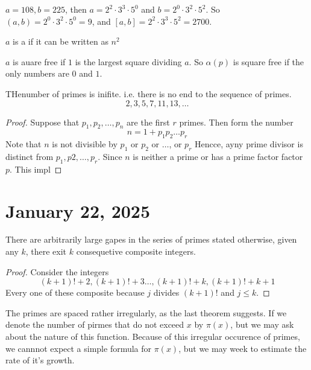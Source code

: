 \documentclass[11pt]{article}
\begin{document}
\begin{example}
    \(a = 108, b = 225\), then \(a = 2^2 \cdot 3^3 \cdot 5^0\) and \(b = 2^0 \cdot 3^2 \cdot 5^2\). So \((a, b) = 2^0 \cdot 3^2 \cdot 5^0 = 9\), and \([a, b] = 2^2 \cdot 3^3 \cdot 5^2 = 2700\).
\end{example}

\begin{definition}
    \(a\) is a  if it can be written as \(n^2\)
\end{definition}
\begin{remark}
    \(a\) is auare free if \(1\) is the largest square dividing \(a\). So \(\alpha(p)\) is square free if the only numbers are \(0\) and \(1\).
\end{remark}

\begin{theorem}[Euclid]
    THenumber of primes is inifite. i.e. there is no end to the sequence of primes. \[2, 3, 5, 7, 11, 13, \ldots\]
\end{theorem}

\begin{proof}
    Suppose that \(p_1, p_2, \ldots, p_n\) are the first \(r\) primes. Then form the number \[n = 1 + p_1 p_2\ldots p_r\]
    Note that \(n\) is not divisible by \(p_1\) or \(p_2\) or \(\ldots\), or
    \(p_r\) Hencce, ayny prime divisor is distinct from \(p_1, p2, \ldots, p_r\).
    Since \(n\) is neither a prime or has a prime factor factor \(p\). This impl
\end{proof}
\section{January 22, 2025}
\begin{theorem}
    There are arbitrarily large gapes in the series of primes stated otherwise, given any \(k\), there exit \(k\) consequetive composite integers.
\end{theorem}
\begin{proof}
    Consider the integers
    \[(k + 1)! + 2, (k + 1)! + 3 \ldots, (k + 1)! + k, (k + 1)! + k + 1\]
    Every one of these composite because \(j\) divides \((k + 1)!\) and \(j
    \leqslant k\).
\end{proof}

The primes are spaced rather irregularly, as the last theorem suggests. If we
denote the number of pirmes that do not exceed \(x\) by \(\pi(x)\), but we may
ask about the nature of this function. Because of this irregular occurence of
primes, we cannnot expect a simple formula for \(\pi(x)\), but we may week to
estimate the rate of it's growth.
\end{document}
